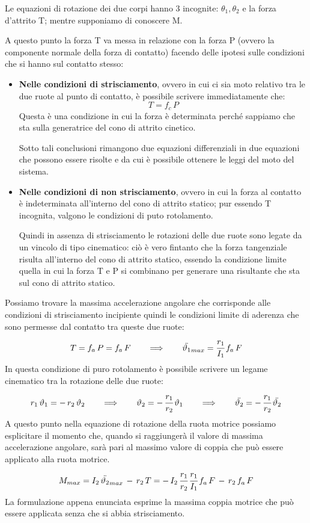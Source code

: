 Le equazioni di rotazione dei due corpi hanno 3 incognite: $\theta_1, \theta_2$ e la forza d'attrito T; mentre supponiamo di conoscere M.

A questo punto la forza T va messa in relazione con la forza P (ovvero la componente normale della forza di contatto) facendo delle ipotesi sulle condizioni che si hanno sul contatto stesso:
\begin{itemize}
\item \textbf{Nelle condizioni di strisciamento}, ovvero in cui ci sia moto relativo tra le due ruote al punto di contatto, è possibile scrivere immediatamente che:
\[T = f_c\,P\]
Questa è una condizione in cui la forza è determinata perché sappiamo che sta sulla generatrice del cono di attrito cinetico.

Sotto tali conclusioni rimangono due equazioni differenziali in due equazioni che possono essere risolte e da cui è possibile ottenere le leggi del moto del sistema.
\item \textbf{Nelle condizioni di non strisciamento}, ovvero in cui la forza al contatto è indeterminata all'interno del cono di attrito statico; pur essendo T incognita, valgono le condizioni di puto rotolamento.

Quindi in assenza di strisciamento le rotazioni delle due ruote sono legate da un vincolo di tipo cinematico: ciò è vero fintanto che la forza tangenziale risulta all'interno del cono di attrito statico, essendo la condizione limite quella in cui la forza T e P si combinano per generare una risultante che sta sul cono di attrito statico.
\end{itemize}

Possiamo trovare la massima accelerazione angolare che corrisponde alle condizioni di strisciamento incipiente quindi le condizioni limite di aderenza che sono permesse dal contatto tra queste due ruote:
\[T = f_a\,P = f_a\,F \qquad\Longrightarrow\qquad \ddot{\theta_1}_{max} = \cfrac{r_1}{I_1}\,f_a\,F\]
In questa condizione di puro rotolamento è possibile scrivere un legame cinematico tra la rotazione delle due ruote:
\[r_1\,\theta_1 = -\,r_2\,\theta_2\qquad\Longrightarrow\qquad \theta_2 = -\,\cfrac{r_1}{r_2}\,\theta_1\qquad\Longrightarrow\qquad \ddot{\theta_2} = -\,\cfrac{r_1}{r_2}\,\ddot{\theta_2}\]
A questo punto nella equazione di rotazione della ruota motrice possiamo esplicitare il momento che, quando si raggiungerà il valore di massima accelerazione angolare, sarà pari al massimo valore di coppia che può essere applicato alla ruota motrice.
\[M_{max} = I_2\,\ddot{\theta_2}_{max}\,-\,r_2\,T = -\,I_2\,\cfrac{r_1}{r_2}\,\cfrac{r_1}{I_1}\,f_a\,F\,-\,r_2\,f_a\,F \]
La formulazione appena enunciata esprime la massima coppia motrice che può essere applicata senza che si abbia strisciamento.

